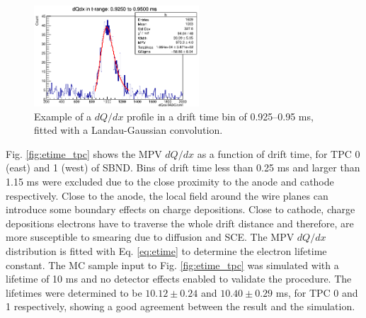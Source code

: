 \begin{figure}[ht!] 
\centering    
\includegraphics[width=0.55\textwidth]{dqdxMPV}
\caption[dQ/dx Profile Fitted With a Laundau-Gaussian]{
Example of a $dQ/dx$ profile in a drift time bin of 0.925--0.95 ms, fitted with a Landau-Gaussian convolution.
}
\label{fig:dqdxMPV}
\vspace{0.5cm}
\end{figure}

Fig. \ref{fig:etime_tpc} shows the MPV $dQ/dx$ as a function of drift time, for TPC 0 (east) and 1 (west) of SBND.
Bins of drift time less than 0.25 ms and larger than 1.15 ms were excluded due to the close proximity to the anode and cathode respectively.
Close to the anode, the local field around the wire planes can introduce some boundary effects on charge depositions. 
Close to cathode, charge depositions electrons have to traverse the whole drift distance and therefore, are more susceptible to smearing due to diffusion and SCE.
The MPV $dQ/dx$ distribution is fitted with Eq. \ref{eq:etime} to determine the electron lifetime constant.
The MC sample input to Fig. \ref{fig:etime_tpc} was simulated with a lifetime of 10 ms and no detector effects enabled to validate the procedure.                                       
The lifetimes were determined to be $10.12\pm0.24$ and $10.40\pm0.29$ ms, for TPC 0 and 1 respectively, showing a good agreement between the result and the simulation. 

